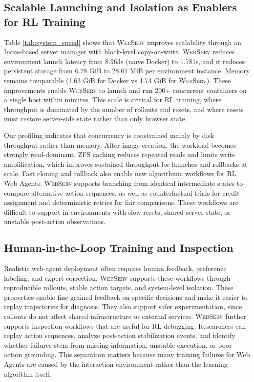 \documentclass{article}
\DeclareRobustCommand{\projectname}{\textsc{WebServ}\xspace}
\begin{document}
\subsection{Scalable Launching and Isolation as Enablers for RL Training}
Table \ref{tab:system_speed} shows that \projectname improves scalability through an Incus-based server manager with block-level copy-on-write. \projectname reduces environment launch latency from 8.963s (naïve Docker) to 1.781s, and it reduces persistent storage from 6.78 GiB to 28.01 MiB per environment instance. Memory remains comparable (1.63 GiB for Docker vs 1.74 GiB for \projectname). These improvements enable \projectname to launch and run 200+ concurrent containers on a single host within minutes. This scale is critical for RL training, where throughput is dominated by the number of rollouts and resets, and where resets must restore server-side state rather than only browser state.

Our profiling indicates that concurrency is constrained mainly by disk throughput rather than memory. After image creation, the workload becomes strongly read-dominant. ZFS caching reduces repeated reads and limits write amplification, which improves sustained throughput for launches and rollbacks at scale. Fast cloning and rollback also enable new algorithmic workflows for RL Web Agents. \projectname supports branching from identical intermediate states to compare alternative action sequences, as well as counterfactual trials for credit assignment and deterministic retries for fair comparisons. These workflows are difficult to support in environments with slow resets, shared server state, or unstable post-action observations.

\subsection{Human-in-the-Loop Training and Inspection}
Realistic web-agent deployment often requires human feedback, preference labeling, and expert correction. \projectname supports these workflows through reproducible rollouts, stable action targets, and system-level isolation. These properties enable fine-grained feedback on specific decisions and make it easier to replay trajectories for diagnosis. They also support safer experimentation, since rollouts do not affect shared infrastructure or external services.
\projectname further supports inspection workflows that are useful for RL debugging. Researchers can replay action sequences, analyze post-action stabilization events, and identify whether failures stem from missing information, unstable execution, or poor action grounding. This separation matters because many training failures for Web Agents are caused by the interaction environment rather than the learning algorithm itself.
\end{document}
